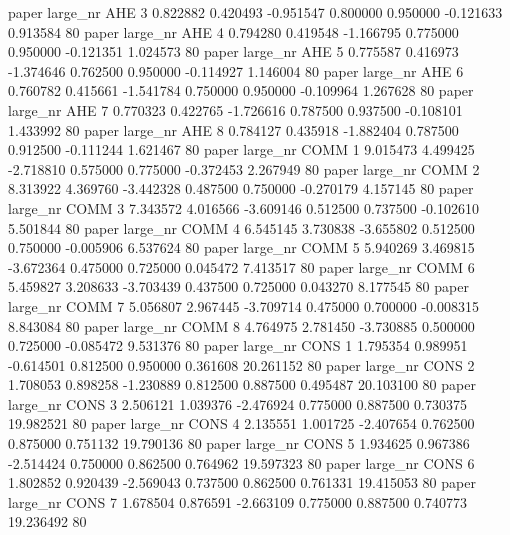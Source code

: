        paper   large_nr      AHE                 3  0.822882  0.420493  -0.951547 0.800000 0.950000 -0.121633    0.913584 80
       paper   large_nr      AHE                 4  0.794280  0.419548  -1.166795 0.775000 0.950000 -0.121351    1.024573 80
       paper   large_nr      AHE                 5  0.775587  0.416973  -1.374646 0.762500 0.950000 -0.114927    1.146004 80
       paper   large_nr      AHE                 6  0.760782  0.415661  -1.541784 0.750000 0.950000 -0.109964    1.267628 80
       paper   large_nr      AHE                 7  0.770323  0.422765  -1.726616 0.787500 0.937500 -0.108101    1.433992 80
       paper   large_nr      AHE                 8  0.784127  0.435918  -1.882404 0.787500 0.912500 -0.111244    1.621467 80
       paper   large_nr     COMM                 1  9.015473  4.499425  -2.718810 0.575000 0.775000 -0.372453    2.267949 80
       paper   large_nr     COMM                 2  8.313922  4.369760  -3.442328 0.487500 0.750000 -0.270179    4.157145 80
       paper   large_nr     COMM                 3  7.343572  4.016566  -3.609146 0.512500 0.737500 -0.102610    5.501844 80
       paper   large_nr     COMM                 4  6.545145  3.730838  -3.655802 0.512500 0.750000 -0.005906    6.537624 80
       paper   large_nr     COMM                 5  5.940269  3.469815  -3.672364 0.475000 0.725000  0.045472    7.413517 80
       paper   large_nr     COMM                 6  5.459827  3.208633  -3.703439 0.437500 0.725000  0.043270    8.177545 80
       paper   large_nr     COMM                 7  5.056807  2.967445  -3.709714 0.475000 0.700000 -0.008315    8.843084 80
       paper   large_nr     COMM                 8  4.764975  2.781450  -3.730885 0.500000 0.725000 -0.085472    9.531376 80
       paper   large_nr     CONS                 1  1.795354  0.989951  -0.614501 0.812500 0.950000  0.361608   20.261152 80
       paper   large_nr     CONS                 2  1.708053  0.898258  -1.230889 0.812500 0.887500  0.495487   20.103100 80
       paper   large_nr     CONS                 3  2.506121  1.039376  -2.476924 0.775000 0.887500  0.730375   19.982521 80
       paper   large_nr     CONS                 4  2.135551  1.001725  -2.407654 0.762500 0.875000  0.751132   19.790136 80
       paper   large_nr     CONS                 5  1.934625  0.967386  -2.514424 0.750000 0.862500  0.764962   19.597323 80
       paper   large_nr     CONS                 6  1.802852  0.920439  -2.569043 0.737500 0.862500  0.761331   19.415053 80
       paper   large_nr     CONS                 7  1.678504  0.876591  -2.663109 0.775000 0.887500  0.740773   19.236492 80
